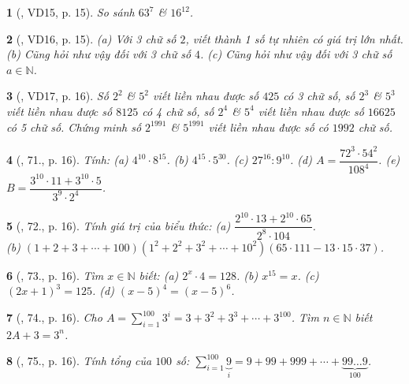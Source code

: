 \documentclass{article}
\newtheorem{baitoan}{}
\begin{document}
\begin{baitoan}[\cite{Binh_Toan_6_tap_1}, VD15, p. 15]
	So sánh $63^7$ \& $16^{12}$.
\end{baitoan}

\begin{baitoan}[\cite{Binh_Toan_6_tap_1}, VD16, p. 15]
	(a) Với 3 chữ số $2$, viết thành 1 số tự nhiên có giá trị lớn nhất. (b) Cũng hỏi như vậy đối với 3 chữ số $4$. (c) Cũng hỏi như vậy đối với 3 chữ số $a\in\mathbb{N}$.
\end{baitoan}

\begin{baitoan}[\cite{Binh_Toan_6_tap_1}, VD17, p. 16]
	Số $2^2$ \& $5^2$ viết liền nhau được số $425$ có 3 chữ số, số $2^3$ \& $5^3$ viết liền nhau được số $8125$ có 4 chữ số, số $2^4$ \& $5^4$ viết liền nhau được số $16625$ có 5 chữ số. Chứng minh số $2^{1991}$ \& $5^{1991}$ viết liền nhau được số có $1992$ chữ số.
\end{baitoan}

\begin{baitoan}[\cite{Binh_Toan_6_tap_1}, 71., p. 16]
	Tính: (a) $4^{10}\cdot8^{15}$. (b) $4^{15}\cdot5^{30}$. (c) $27^{16}:9^{10}$. (d) $A = \dfrac{72^3\cdot54^2}{108^4}$. (e) $B = \dfrac{3^{10}\cdot11 + 3^{10}\cdot5}{3^9\cdot2^4}$.
\end{baitoan}

\begin{baitoan}[\cite{Binh_Toan_6_tap_1}, 72., p. 16]
	Tính giá trị của biểu thức: (a) $\dfrac{2^{10}\cdot13 + 2^{10}\cdot65}{2^8\cdot104}$.\\(b) $(1 + 2 + 3 + \cdots + 100)(1^2 + 2^2 + 3^2 + \cdots + 10^2)(65\cdot111 - 13\cdot15\cdot37)$.
\end{baitoan}

\begin{baitoan}[\cite{Binh_Toan_6_tap_1}, 73., p. 16]
	Tìm $x\in\mathbb{N}$ biết: (a) $2^x\cdot4 = 128$. (b) $x^{15} = x$. (c) $(2x + 1)^3 = 125$. (d) $(x - 5)^4 = (x - 5)^6$.
\end{baitoan}

\begin{baitoan}[\cite{Binh_Toan_6_tap_1}, 74., p. 16]
	Cho $A = \sum_{i=1}^{100} 3^i = 3 + 3^2 + 3^3 + \cdots + 3^{100}$. Tìm $n\in\mathbb{N}$ biết $2A + 3 = 3^n$.
\end{baitoan}

\begin{baitoan}[\cite{Binh_Toan_6_tap_1}, 75., p. 16]
	Tính tổng của $100$ số: $\sum_{i=1}^{100} \underbrace{9}_i = 9+ 99 + 999 + \cdots + \underbrace{99\ldots9}_{100}$.
\end{baitoan}
\end{document}
